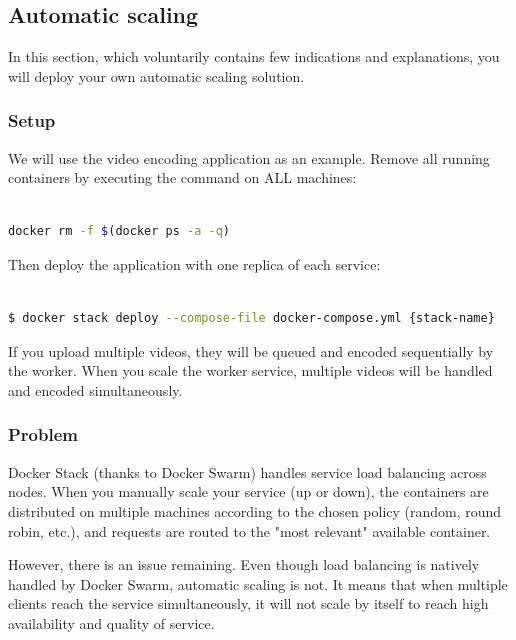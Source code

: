 \documentclass[a4paper,11pt]{exam}
\begin{document}
\clearpage

\subsection{Automatic scaling}

In this section, which voluntarily contains few indications and explanations, you will deploy your own automatic scaling solution.

\subsubsection{Setup}

We will use the video encoding application as an example.
Remove all running containers by executing the command on ALL machines:

\begin{lstlisting}[frame=single,language={sh}]  % Start your code-block

docker rm -f $(docker ps -a -q)

\end{lstlisting}

Then deploy the application with one replica of each service:

\begin{lstlisting}[frame=single,language={sh}]  % Start your code-block

$ docker stack deploy --compose-file docker-compose.yml {stack-name}

\end{lstlisting}

If you upload multiple videos, they will be queued and encoded sequentially by the worker.
When you scale the worker service, multiple videos will be handled and encoded simultaneously.

\subsubsection{Problem}

Docker Stack (thanks to Docker Swarm) handles service load balancing across nodes.
When you manually scale your service (up or down), the containers are distributed on multiple machines according to the chosen policy (random, round robin, etc.), and requests are routed to the "most relevant" available container.

However, there is an issue remaining.
Even though load balancing is natively handled by Docker Swarm, automatic scaling is not.
It means that when multiple clients reach the service simultaneously, it will not scale by itself to reach high availability and quality of service.
\end{document}
